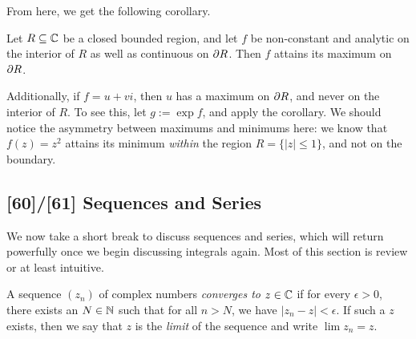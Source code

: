 \documentclass{article}
\begin{document}
From here, we get the following corollary.
\begin{corollary}
Let $R\subseteq \mathbb C$ be a closed bounded region, and let $f$ be non-constant and analytic on the interior of $R$ as well as continuous on $\partial R$. Then $f$ attains its maximum on $\partial R$.
\end{corollary}

Additionally, if $f = u+vi$, then $u$ has a maximum on $\partial R$, and never on the interior of $R$. To see this, let $g := \exp f$, and apply the corollary. We should notice the asymmetry between maximums and minimums here: we know that $f(z) = z^2$ attains its minimum \textit{within} the region $R = \{|z| \leq 1\}$, and not on the boundary.

\subsection*{[60]/[61] Sequences and Series}
We now take a short break to discuss sequences and series, which will return powerfully once we begin discussing integrals again. Most of this section is review or at least intuitive.
\begin{definition}
A sequence $(z_n)$ of complex numbers \textit{converges to $z\in \mathbb C$} if for every $\epsilon > 0$, there exists an $N\in\mathbb N$ such that for all $n>N$, we have $|z_n - z| < \epsilon$. If such a $z$ exists, then we say that $z$ is the \textit{limit} of the sequence and write $\lim z_n = z$.
\end{definition}
\end{document}

